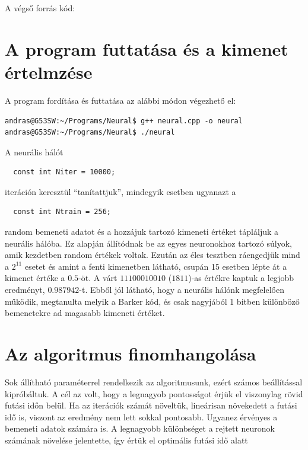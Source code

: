 \documentclass[a4paper]{article}
\begin{document}
A végső forrás kód:



\section{A program futtatása és a kimenet értelmzése}

A program fordítása és futtatása az alábbi módon végezhető el:

\lstset{language=Bash}
\begin{lstlisting}
andras@G53SW:~/Programs/Neural$ g++ neural.cpp -o neural
andras@G53SW:~/Programs/Neural$ ./neural
\end{lstlisting}



A neurális hálót

\lstset{language=C++}
\begin{lstlisting}
  const int Niter = 10000;
\end{lstlisting}
iteráción keresztül ``tanítattjuk'', mindegyik esetben ugyanazt a
\begin{lstlisting}
  const int Ntrain = 256;
\end{lstlisting}
random bemeneti adatot és a hozzájuk tartozó kimeneti értéket tápláljuk a neurális hálóba. Ez alapján állítódnak be az egyes neuronokhoz tartozó súlyok, amik kezdetben random értékek voltak. Ezután az éles tesztben ráengedjük mind a $2^{11}$ esetet és amint a fenti kimenetben látható, csupán 15 esetben lépte át a kimenet értéke a $0.5$-öt. A várt $11100010010$ ($1811$)-as értékre kaptuk a legjobb eredményt, $0.987942$-t. Ebből jól látható, hogy a neurális hálónk megfelelően működik, megtanulta melyik a Barker kód, és csak nagyjából 1 bitben különböző bemenetekre ad magasabb kimeneti értéket.

\section{Az algoritmus finomhangolása}
Sok állítható paraméterrel rendelkezik az algoritmusunk, ezért számos beállítással kipróbáltuk. A cél az volt, hogy a legnagyob pontosságot érjük el viszonylag rövid futási időn belül. Ha az iterációk számát növeltük, lineárisan növekedett a futási idő is, viszont az eredmény nem lett sokkal pontosabb. Ugyanez érvényes a bemeneti adatok számára is. A legnagyobb különbséget a rejtett neuronok számának növelése jelentette, így értük el optimális futási idő alatt
\end{document}
